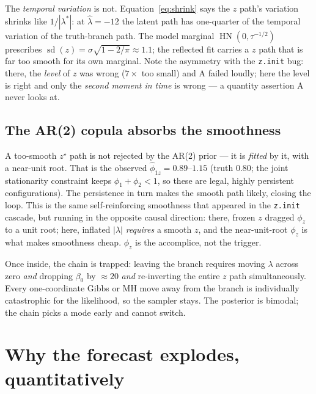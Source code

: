 \documentclass[11pt]{article}
\newcommand{\code}[1]{\texttt{#1}}
\DeclareMathOperator{\hn}{HN}
\DeclareMathOperator{\sd}{sd}
\begin{document}
The \emph{temporal variation} is not. Equation~\eqref{eq:shrink} says the $z$
path's variation shrinks like $1/|\lambda^\ast|$: at $\hat\lambda = -12$ the
latent path has one-quarter of the temporal variation of the truth-branch path.
The model marginal $\hn(0, \tau^{-1/2})$ prescribes
$\sd(z) = \sigma\sqrt{1 - 2/\pi} \approx 1.1$; the reflected fit carries a $z$
path that is far too smooth for its own marginal. Note the asymmetry with the
\code{z.init} bug: there, the \emph{level} of $z$ was wrong ($7\times$ too
small) and A failed loudly; here the level is right and only the
\emph{second moment in time} is wrong --- a quantity assertion A never looks
at.

\subsection{The AR(2) copula absorbs the smoothness}

A too-smooth $z^\star$ path is not rejected by the AR(2) prior --- it is
\emph{fitted} by it, with a near-unit root. That is the observed
$\hat\phi_{1z} = 0.89$--$1.15$ (truth $0.80$; the joint stationarity constraint
keeps $\phi_1 + \phi_2 < 1$, so these are legal, highly persistent
configurations). The persistence in turn makes the smooth path likely, closing
the loop. This is the same self-reinforcing smoothness that appeared in the
\code{z.init} cascade, but running in the opposite causal direction: there,
frozen $z$ dragged $\phi_z$ to a unit root; here, inflated $|\lambda|$
\emph{requires} a smooth $z$, and the near-unit-root $\phi_z$ is what makes
smoothness cheap. $\phi_z$ is the accomplice, not the trigger.

Once inside, the chain is trapped: leaving the branch requires moving
$\lambda$ across zero \emph{and} dropping $\beta_0$ by $\approx 20$ \emph{and}
re-inverting the entire $z$ path simultaneously. Every one-coordinate Gibbs or
MH move away from the branch is individually catastrophic for the likelihood,
so the sampler stays. The posterior is bimodal; the chain picks a mode early
and cannot switch.

\section{Why the forecast explodes, quantitatively}
\end{document}
